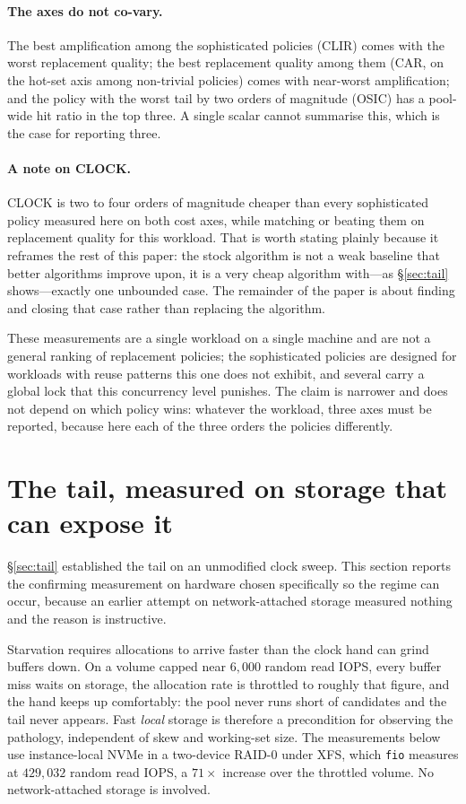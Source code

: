 \documentclass[sigconf,nonacm]{acmart}
\begin{document}
\paragraph{The axes do not co-vary.} The best amplification among the
sophisticated policies (CLIR) comes with the worst replacement quality; the
best replacement quality among them (CAR, on the hot-set axis among
non-trivial policies) comes with near-worst amplification; and the policy with
the worst tail by two orders of magnitude (OSIC) has a pool-wide hit ratio in
the top three. A single scalar cannot summarise this, which is the case for
reporting three.

\paragraph{A note on CLOCK.} CLOCK is two to four orders of magnitude cheaper
than every sophisticated policy measured here on both cost axes, while
matching or beating them on replacement quality for this workload. That is
worth stating plainly because it reframes the rest of this paper: the stock
algorithm is not a weak baseline that better algorithms improve upon, it is a
very cheap algorithm with---as \S\ref{sec:tail} shows---exactly one unbounded
case. The remainder of the paper is about finding and closing that case rather
than replacing the algorithm.

These measurements are a single workload on a single machine and are not a
general ranking of replacement policies; the sophisticated policies are
designed for workloads with reuse patterns this one does not exhibit, and
several carry a global lock that this concurrency level punishes. The claim is
narrower and does not depend on which policy wins: whatever the workload, three
axes must be reported, because here each of the three orders the policies
differently.

\section{The tail, measured on storage that can expose it}
\label{sec:tailnvme}

\S\ref{sec:tail} established the tail on an unmodified clock sweep. This
section reports the confirming measurement on hardware chosen specifically so
the regime can occur, because an earlier attempt on network-attached storage
measured nothing and the reason is instructive.

Starvation requires allocations to arrive faster than the clock hand can grind
buffers down. On a volume capped near $6{,}000$ random read IOPS, every buffer
miss waits on storage, the allocation rate is throttled to roughly that figure,
and the hand keeps up comfortably: the pool never runs short of candidates and
the tail never appears. Fast \emph{local} storage is therefore a precondition
for observing the pathology, independent of skew and working-set size. The
measurements below use instance-local NVMe in a two-device RAID-0 under XFS,
which \texttt{fio} measures at $429{,}032$ random read IOPS, a $71\times$
increase over the throttled volume. No network-attached storage is involved.
\end{document}
